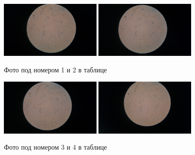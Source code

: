 \documentclass[a4paper, 12pt]{article}%
\begin{document}
\begin{table}[h]
\begin{center}
\end{center}
\end{table}

\begin{figure}[h]
\begin{center}
\includegraphics[width = 0.45\textwidth]{11.jpg}
\includegraphics[width = 0.45\textwidth]{12.jpg}
\caption{Фото под номером 1 и 2 в таблице}
\end{center}
\end{figure}
\newpage
\begin{figure}[h]
\begin{center}
\includegraphics[width = 0.45\textwidth]{13.jpg}
\includegraphics[width = 0.45\textwidth]{14.jpg}
\caption{Фото под номером 3 и 4 в таблице}
\end{center}
\end{figure}
\end{document}
